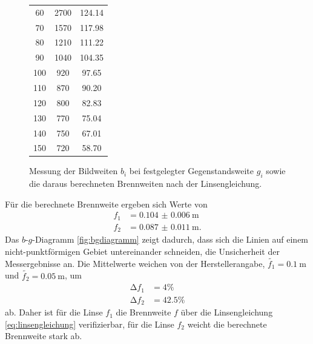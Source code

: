 \begin{figure}[hp]
\begin{minipage}{0.49\textwidth}
\begin{tabular}{S[table-format=3] S[table-format=3] S[table-format=3.2]}
				60  & 2700 & 124.14 \\
				70  & 1570 & 117.98 \\
				80  & 1210 & 111.22 \\
				90  & 1040 & 104.35 \\
				100 &  920 &  97.65 \\
				110 &  870 &  90.20 \\
				120 &  800 &  82.83 \\
				130 &  770 &  75.04 \\
				140 &  750 &  67.01 \\
				150 &  720 &  58.70 \\
			\bottomrule
			\end{tabular}
		\end{minipage}
	\caption{Messung der Bildweiten $b_i$ bei festgelegter Gegenstandsweite $g_i$ sowie die daraus berechneten Brennweiten nach der Linsengleichung.}
	\label{tab:M1}
\end{figure}
Für die berechnete Brennweite ergeben sich Werte von 
\begin{align}
	f_1 &= \SI{0.104(6)}{\meter}\\
	f_2 &= \SI{0.087(11)}{\meter}.
\end{align}
Das $b$-$g$-Diagramm \ref{fig:bgdiagramm} zeigt dadurch, dass sich die Linien auf einem nicht-punktförmigen Gebiet untereinander schneiden, die Unsicherheit der Messergebnisse an.
Die Mittelwerte weichen von der Herstellerangabe, $\tilde{f_1}=\SI{0.1}{\meter}$ und $\tilde{f_2}=\SI{0.05}{\meter}$, um 
\begin{align}
	\mathup{\Delta}f_1 &= 4\% \\	
	\mathup{\Delta}f_2 &= 42.5\%
\end{align}
ab.
Daher ist für die Linse $f_1$  die Brennweite $f$ über die Linsengleichung \eqref{eq:linsengleichung} verifizierbar, für die Linse $f_2$ weicht die berechnete Brennweite stark ab.

